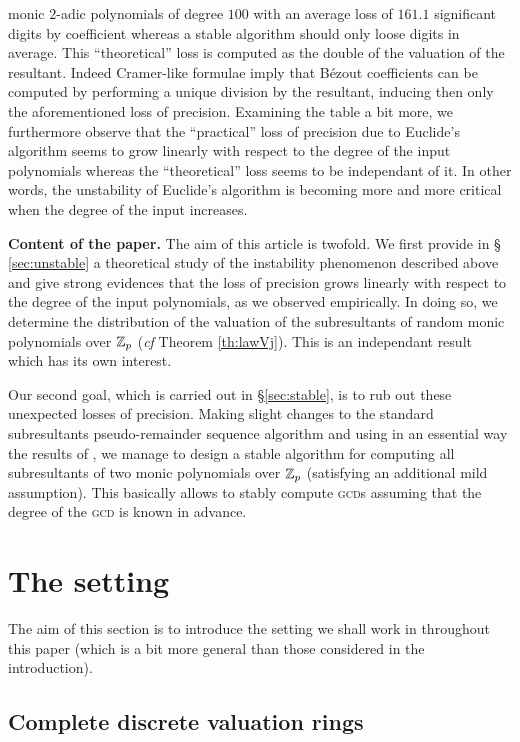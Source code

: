 \documentclass{sig-alternate}
\begin{document}
monic $2$-adic polynomials of degree $100$ with an average loss of 
$161.1$ significant digits by coefficient whereas a stable 
algorithm should only loose  digits in average. This 
``theoretical'' loss is computed as the double of the valuation of the 
resultant. Indeed Cramer-like formulae imply that B\'ezout coefficients 
can be computed by performing a unique division by the resultant, 
inducing then only the aforementioned loss of precision. Examining the 
table a bit more, we furthermore observe that the ``practical'' loss of 
precision due to Euclide's algorithm seems to grow linearly with respect 
to the degree of the input polynomials whereas the ``theoretical'' loss 
seems to be independant of it. In other words, the unstability of 
Euclide's algorithm is becoming more and more critical when the degree 
of the input increases.

\medskip

\noindent
{\bf Content of the paper.}
The aim of this article is twofold. We first provide in \S 
\ref{sec:unstable} a theoretical study of the instability phenomenon 
described above and give strong evidences that the loss of precision 
grows linearly with respect to the degree of the input polynomials, as we 
observed empirically. In doing so, we determine the distribution of the 
valuation of the subresultants of random monic polynomials over $\mathbb Z_p$ 
(\emph{cf} Theorem \ref{th:lawVj}). This is an independant result which 
has its own interest.

Our second goal, which is carried out in \S \ref{sec:stable}, is to rub 
out these unexpected losses of precision. Making slight changes to the 
standard subresultants pseudo-remainder sequence algorithm and using in 
an essential way the results of \cite{padicprec}, we manage to design a stable 
algorithm for computing all subresultants of two monic polynomials over 
$\mathbb Z_p$ (satisfying an additional mild assumption). This basically allows 
to stably compute \textsc{gcd}s assuming that the degree of the 
\textsc{gcd} is known in advance.

\section{The setting}

The aim of this section is to introduce the setting we shall work in 
throughout this paper (which is a bit more general than those considered 
in the introduction).

\subsection{Complete discrete valuation rings}
\end{document}
